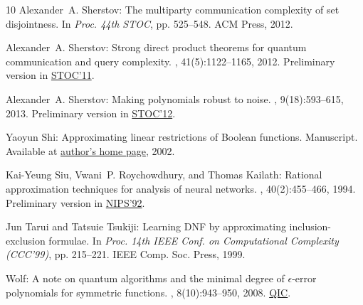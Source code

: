 \begin{thebibliography}{10}
{\sc Alexander~A. Sherstov}: The multiparty communication complexity of set
  disjointness.
\newblock In {\em Proc. 44th STOC}, pp. 525--548. ACM Press, 2012.
\newblock [\epfmtdoi{10.1145/2213977.2214026}]

{\sc Alexander~A. Sherstov}: Strong direct product theorems for quantum
  communication and query complexity.
, 41(5):1122--1165, 2012.
\newblock Preliminary version in
  \href{http://dx.doi.org/10.1145/1993636.1993643}{STOC'11}.
\newblock [\epfmtdoi{10.1137/110842661}]

{\sc Alexander~A. Sherstov}: Making polynomials robust to noise.
, 9(18):593--615, 2013.
\newblock Preliminary version in
  \href{http://dx.doi.org/10.1145/2213977.2214044}{STOC'12}.

{\sc Yaoyun Shi}: Approximating linear restrictions of {B}oolean functions.
\newblock Manuscript. Available at
  \href{http://web.eecs.umich.edu/~shiyy/mypapers/linear02-j.ps}{author's home
  page}, 2002.

{\sc Kai-Yeung Siu, Vwani~P. Roychowdhury, and Thomas Kailath}: Rational
  approximation techniques for analysis of neural networks.
, 40(2):455--466, 1994.
\newblock Preliminary version in
  \href{http://books.nips.cc/nips05.html}{NIPS'92}.
\newblock [\epfmtdoi{10.1109/18.312168}]

{\sc Jun Tarui and Tatsuie Tsukiji}: Learning {DNF} by approximating
  inclusion-exclusion formulae.
\newblock In {\em Proc. 14th IEEE Conf. on Computational Complexity (CCC'99)},
  pp. 215--221. IEEE Comp. Soc. Press, 1999.

{ Wolf}: A note on quantum algorithms and the minimal degree of
  $\epsilon$-error polynomials for symmetric functions.
, 8(10):943--950, 2008.
\newblock
  \href{http://www.rintonpress.com/journals/qiconline.html\#v8n10}{QIC}.

\end{thebibliography}
